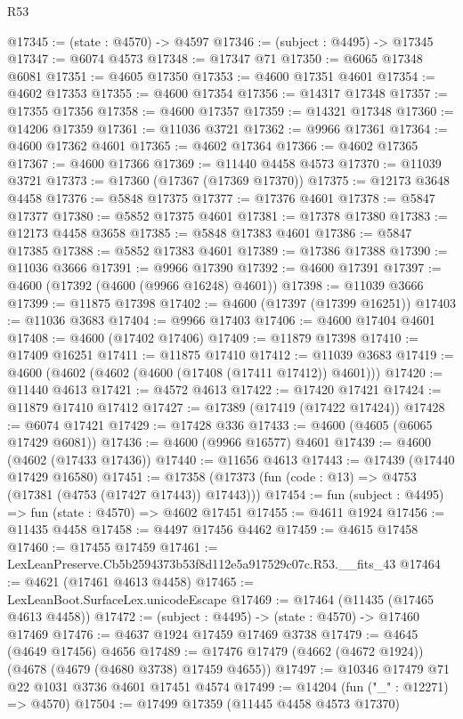 \begin{lexlean}{R53}
\begin{coremodule}
@17345 := (state : @4570) -> @4597
@17346 := (subject : @4495) -> @17345
@17347 := @6074 @4573
@17348 := @17347 @71
@17350 := @6065 @17348 @6081
@17351 := @4605 @17350
@17353 := @4600 @17351 @4601
@17354 := @4602 @17353
@17355 := @4600 @17354
@17356 := @14317 @17348
@17357 := @17355 @17356
@17358 := @4600 @17357
@17359 := @14321 @17348
@17360 := @14206 @17359
@17361 := @11036 @3721
@17362 := @9966 @17361
@17364 := @4600 @17362 @4601
@17365 := @4602 @17364
@17366 := @4602 @17365
@17367 := @4600 @17366
@17369 := @11440 @4458 @4573
@17370 := @11039 @3721
@17373 := @17360 (@17367 (@17369 @17370))
@17375 := @12173 @3648 @4458
@17376 := @5848 @17375
@17377 := @17376 @4601
@17378 := @5847 @17377
@17380 := @5852 @17375 @4601
@17381 := @17378 @17380
@17383 := @12173 @4458 @3658
@17385 := @5848 @17383 @4601
@17386 := @5847 @17385
@17388 := @5852 @17383 @4601
@17389 := @17386 @17388
@17390 := @11036 @3666
@17391 := @9966 @17390
@17392 := @4600 @17391
@17397 := @4600 (@17392 (@4600 (@9966 @16248) @4601))
@17398 := @11039 @3666
@17399 := @11875 @17398
@17402 := @4600 (@17397 (@17399 @16251))
@17403 := @11036 @3683
@17404 := @9966 @17403
@17406 := @4600 @17404 @4601
@17408 := @4600 (@17402 @17406)
@17409 := @11879 @17398
@17410 := @17409 @16251
@17411 := @11875 @17410
@17412 := @11039 @3683
@17419 := @4600 (@4602 (@4602 (@4600 (@17408 (@17411 @17412)) @4601)))
@17420 := @11440 @4613
@17421 := @4572 @4613
@17422 := @17420 @17421
@17424 := @11879 @17410 @17412
@17427 := @17389 (@17419 (@17422 @17424))
@17428 := @6074 @17421
@17429 := @17428 @336
@17433 := @4600 (@4605 (@6065 @17429 @6081))
@17436 := @4600 (@9966 @16577) @4601
@17439 := @4600 (@4602 (@17433 @17436))
@17440 := @11656 @4613
@17443 := @17439 (@17440 @17429 @16580)
@17451 := @17358 (@17373 (fun (code : @13) => @4753 (@17381 (@4753 (@17427 @17443)) @17443)))
@17454 := fun (subject : @4495) => fun (state : @4570) => @4602 @17451
@17455 := @4611 @1924
@17456 := @11435 @4458
@17458 := @4497 @17456 @4462
@17459 := @4615 @17458
@17460 := @17455 @17459
@17461 := LexLeanPreserve.Cb5b2594373b53f8d112e5a917529c07c.R53.__fits_43
@17464 := @4621 (@17461 @4613 @4458)
@17465 := LexLeanBoot.SurfaceLex.unicodeEscape
@17469 := @17464 (@11435 (@17465 @4613 @4458))
@17472 := (subject : @4495) -> (state : @4570) -> @17460 @17469
@17476 := @4637 @1924 @17459 @17469 @3738
@17479 := @4645 (@4649 @17456) @4656
@17489 := @17476 @17479 (@4662 (@4672 @1924)) (@4678 (@4679 (@4680 @3738) @17459 @4655))
@17497 := @10346 @17479 @71 @22 @1031 @3736 @4601 @17451 @4574
@17499 := @14204 (fun ("_" : @12271) => @4570)
@17504 := @17499 @17359 (@11445 @4458 @4573 @17370)

\end{coremodule}
\end{lexlean}
